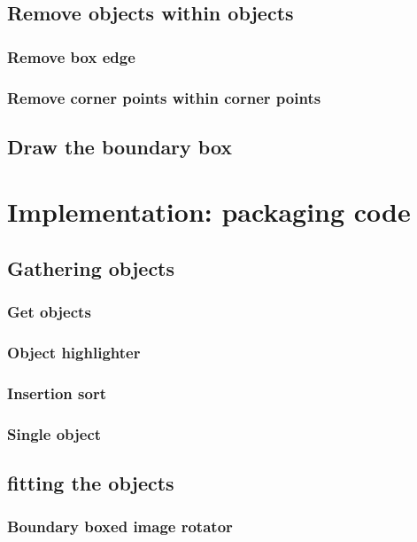 \documentclass[10pt]{article}
\begin{document}
\subsection{Remove objects within objects}
\subsubsection{Remove box edge}

\subsubsection{Remove corner points within corner points}

\subsection{Draw the boundary box}


\section{Implementation: packaging code}
\subsection{Gathering objects}
\subsubsection{Get objects}

\subsubsection{Object highlighter}

\subsubsection{Insertion sort}

\subsubsection{Single object}

\subsection{fitting the objects}
\subsubsection{Boundary boxed image rotator}

\end{document}
